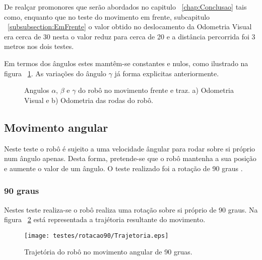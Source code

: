De realçar promonores que serão abordados no capitulo ~\ref{chap:Conclusao} tais como, enquanto que no teste do movimento em frente, subcapitulo ~\ref{subsubsection:EmFrente} o valor obtido no deslocamento da Odometria Visual era cerca de 30 nesta o valor reduz para cerca de 20 e a distância percorrida foi 3 metros nos dois testes.

Em termos dos ângulos estes mamtêm-se constantes e nulos, como ilustrado na figura ~\ref{fig:ang3mFrente2mTraz}. As variações do ângulo $\gamma$ já forma explicitas anteriormente.


\begin{figure}[h!]
	\centering
	\qquad
	\caption{Angulos $\alpha$, $\beta$ e $\gamma$ do robô  no movimento frente e traz. a) Odometria Visual e b) Odometria das rodas do robô.}
	\label{fig:ang3mFrente2mTraz}
\end{figure}


\FloatBarrier
\subsection{Movimento angular}\label{subsubsection:Rotacao}

Neste teste o robô é sujeito a uma velocidade ângular para rodar sobre si próprio num ângulo apenas. Desta forma, pretende-se que o robô mantenha a sua posição e aumente o valor de um ângulo. O teste realizado foi a rotação de 90 graus .


\FloatBarrier
\subsubsection{90 graus}\label{subsubsection:Rotacao90}


Nestes teste realiza-se o robô realiza uma rotação sobre si próprio de 90 graus. Na figura ~\ref{fig:trajRoboRot90} está representada a trajétoria resultante do movimento. 

\begin{figure}[h!]
	\begin{center}
		\leavevmode		
		\texttt{[image: testes/rotacao90/Trajetoria.eps]}
		\caption{Trajetória do robô no movimento angular de 90 gruas.}
		\label{fig:trajRoboRot90}
	\end{center}
\end{figure}


